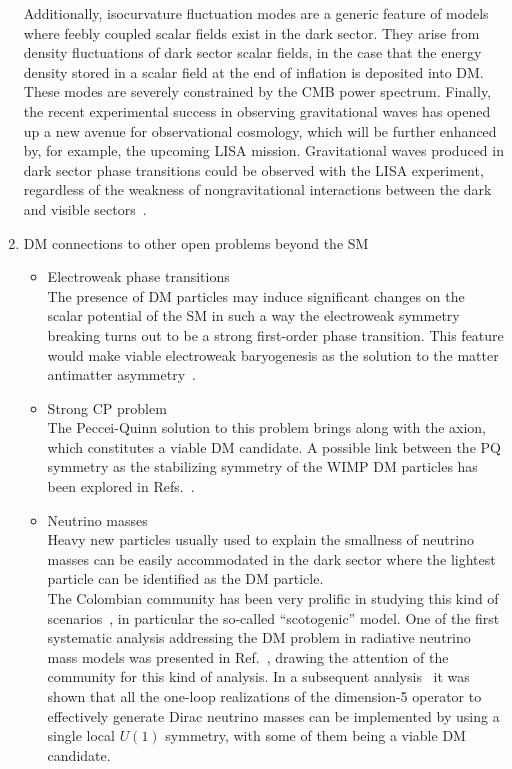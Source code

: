 \documentclass[a4paper,11pt]{article}
\begin{document}
\begin{enumerate}
Additionally, isocurvature fluctuation modes are a generic feature of models where feebly coupled scalar fields exist in the dark sector. They arise from density fluctuations of dark sector scalar fields, in the case that the energy density stored in a scalar field at the end of inflation is deposited into DM. These modes are severely constrained by the CMB power spectrum.
Finally, the recent experimental success in observing gravitational waves has opened up a new avenue for observational cosmology, which will be further enhanced by, for example, the upcoming LISA mission. Gravitational waves produced in dark sector phase transitions could be observed with the LISA experiment, regardless of the weakness of nongravitational interactions between the dark and visible sectors~\cite{Almeida:2018oid, Bernal:2020bfj, Bernal:2020gzm, Bernal:2020qyu}.
%
\item
DM connections to other open problems beyond the SM
\begin{itemize}
\item 
Electroweak phase transitions\\
The presence of DM particles may induce significant changes on the scalar potential of the SM in such a way the electroweak symmetry breaking turns out to be a strong first-order phase transition. This feature would make viable electroweak baryogenesis as the solution to the matter antimatter asymmetry~\cite{Bernal:2009hd, Bernal:2017zvx}.
%
\item
Strong CP problem\\
The Peccei-Quinn solution to this problem brings along with the axion, which constitutes  a viable DM candidate. A possible link between the PQ symmetry as the stabilizing symmetry of the WIMP DM particles has been explored in Refs.~\cite{Ma:2017zyb, Carvajal:2018ohk}.  
%
\item
Neutrino masses\\
Heavy new particles usually used to explain the smallness of neutrino masses can be easily accommodated in the dark sector where the lightest particle can be identified as the DM particle.\\
The Colombian community has been very prolific in studying this kind of scenarios~\cite{Bernal:2017xat}, in particular the so-called ``scotogenic'' model. One of the first systematic analysis addressing the DM problem in radiative neutrino mass models was presented in Ref.~\cite{Restrepo:2013aga}, drawing the attention of the community for this kind of analysis. In a subsequent analysis~\cite{Calle:2018ovc} it was shown that all the one-loop realizations of the dimension-5 operator to effectively generate Dirac neutrino masses can be implemented by using a single local $U(1)$ symmetry, with some of them being a viable DM candidate.

\end{itemize}
\end{enumerate}
\end{document}
